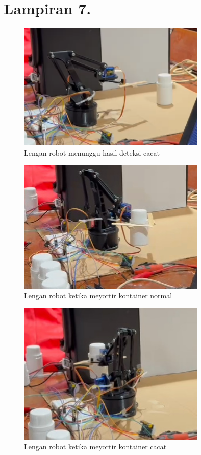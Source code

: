 \vspace{1em}

\section*{Lampiran 7. }
\label{Lampiran 7}
\begin{figure}[H]
  \centering
  \includegraphics[width=0.8\textwidth]{gambar/lampiran/robot.png} \\
  Lengan robot menunggu hasil deteksi cacat
\end{figure}
\vspace{-1em}

\begin{figure}[H]
  \centering
  \includegraphics[width=0.8\textwidth]{gambar/robot_normal.jpeg} \\
  Lengan robot ketika meyortir kontainer normal
\end{figure}
\vspace{-1em}

\begin{figure}[H]
  \centering
  \includegraphics[width=0.8\textwidth]{gambar/robot_cacat.jpeg} \\
  Lengan robot ketika meyortir kontainer cacat
\end{figure}
\vspace{-1em}
